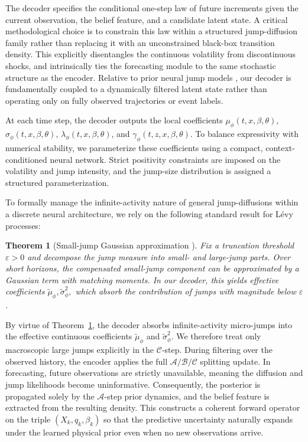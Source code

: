 \documentclass{article}
\newtheorem{theorem}{Theorem}
\begin{document}
The decoder specifies the conditional one-step law of future increments given the current observation, the belief feature, and a candidate latent state. A critical methodological choice is to constrain this law within a structured jump-diffusion family rather than replacing it with an unconstrained black-box transition density. This explicitly disentangles the continuous volatility from discontinuous shocks, and intrinsically ties the forecasting module to the same stochastic structure as the encoder. Relative to prior neural jump models \citep{jia2019neural,gao2025neural,zhang2024neural}, our decoder is fundamentally coupled to a dynamically filtered latent state rather than operating only on fully observed trajectories or event labels.

At each time step, the decoder outputs the local coefficients $\mu_{\phi}(t,x,\beta,\theta)$, $\sigma_{\phi}(t,x,\beta,\theta)$, $\lambda_{\phi}(t,x,\beta,\theta)$, and $\gamma_{\phi}(t,z,x,\beta,\theta)$. To balance expressivity with numerical stability, we parameterize these coefficients using a compact, context-conditioned neural network. Strict positivity constraints are imposed on the volatility and jump intensity, and the jump-size distribution is assigned a structured parameterization.

To formally manage the infinite-activity nature of general jump-diffusions within a discrete neural architecture, we rely on the following standard result for Lévy processes:

\begin{theorem}[Small-jump Gaussian approximation \citep{asmussen2001approximations}]
\label{thm:gaussian-approx}
Fix a truncation threshold $\varepsilon>0$ and decompose the jump measure into small- and large-jump parts. Over short horizons, the compensated small-jump component can be approximated by a Gaussian term with matching moments. In our decoder, this yields effective coefficients
\(
\tilde\mu_\phi, \tilde\sigma_\phi^2,
\)
which absorb the contribution of jumps with magnitude below $\varepsilon$.
\end{theorem}

By virtue of Theorem~\ref{thm:gaussian-approx}, the decoder absorbs infinite-activity micro-jumps into the effective continuous coefficients $\tilde{\mu}_{\phi}$ and $\tilde{\sigma}_{\phi}^2$. We therefore treat only macroscopic large jumps explicitly in the $\mathcal{C}$-step. During filtering over the observed history, the encoder applies the full $\mathcal{A}/\mathcal{B}/\mathcal{C}$ splitting update. In forecasting, future observations are strictly unavailable, meaning the diffusion and jump likelihoods become uninformative. Consequently, the posterior is propagated solely by the $\mathcal{A}$-step prior dynamics, and the belief feature is extracted from the resulting density. This constructs a coherent forward operator on the triple $(X_k, q_k, \beta_k)$ so that the predictive uncertainty naturally expands under the learned physical prior even when no new observations arrive.
\end{document}
